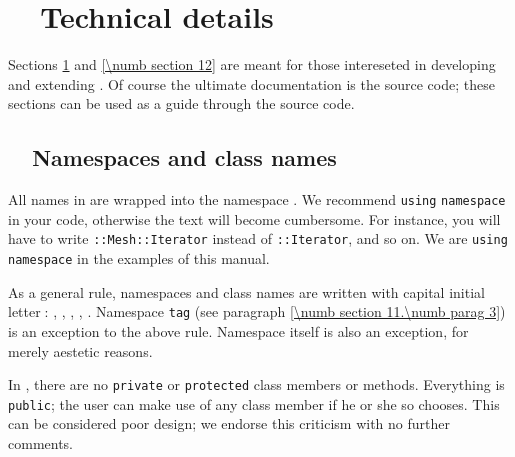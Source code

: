 
\chapter{~~Technical details}\label{\numb section 11}

Sections \ref{\numb section 11} and \ref{\numb section 12} are meant for those intereseted
in developing and extending \maniFEM.
Of course the ultimate documentation is the source code; these sections can be used as
a guide through the source code.


\section{~~Namespaces and class names}\label{\numb section 11.\numb parag 1}

All names in {\maniFEM} are wrapped into the namespace {\small\tt{}}.
We recommend {\small\tt using} {\small\tt namespace} {\small\tt{}} in your code,
otherwise the text will become cumbersome.
For instance, you will have to write {\small\tt{}::Mesh::Iterator} instead of
{\small\tt{}::Iterator}, and so on.
We are {\small\tt using} {\small\tt namespace} {\small\tt{}} in the examples
of this manual.

As a general rule, namespaces and class names are written with capital initial
letter$\;$:
{\small\tt{}}, {\small\tt{}}, {\small\tt{}},
{\small\tt{}}, {\small\tt{}}.
Namespace {\small\tt\textcolor{tag}{tag}} (see paragraph \ref{\numb section 11.\numb parag 3})
is an exception to the above rule.
Namespace {\small\tt{}} itself is also an exception, for merely aestetic reasons.

In \maniFEM, there are no {\small\tt private} or {\small\tt protected} class members or methods.
Everything is {\small\tt public};
the user can make use of any class member if he or she so chooses.
This can be considered poor design; we endorse this criticism with no further comments.

